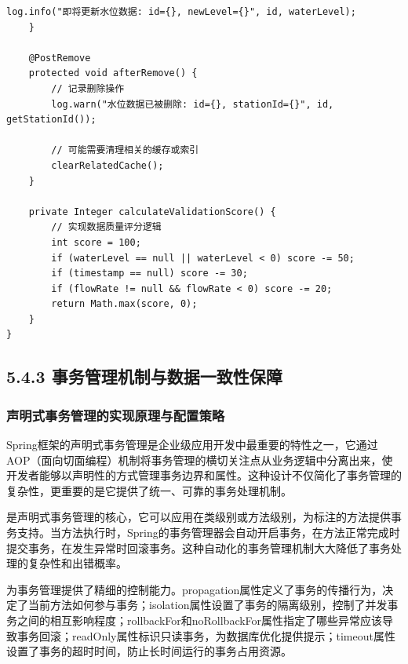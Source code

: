 \begin{lstlisting}[style=java]
        log.info("即将更新水位数据: id={}, newLevel={}", id, waterLevel);
    }
    
    @PostRemove
    protected void afterRemove() {
        // 记录删除操作
        log.warn("水位数据已被删除: id={}, stationId={}", id, getStationId());
        
        // 可能需要清理相关的缓存或索引
        clearRelatedCache();
    }
    
    private Integer calculateValidationScore() {
        // 实现数据质量评分逻辑
        int score = 100;
        if (waterLevel == null || waterLevel < 0) score -= 50;
        if (timestamp == null) score -= 30;
        if (flowRate != null && flowRate < 0) score -= 20;
        return Math.max(score, 0);
    }
}
\end{lstlisting}

\hypertarget{ux4e8bux52a1ux7ba1ux7406ux673aux5236ux4e0eux6570ux636eux4e00ux81f4ux6027ux4fddux969c}{%
\subsection{5.4.3 事务管理机制与数据一致性保障}\label{ux4e8bux52a1ux7ba1ux7406ux673aux5236ux4e0eux6570ux636eux4e00ux81f4ux6027ux4fddux969c}}

\hypertarget{ux58f0ux660eux5f0fux4e8bux52a1ux7ba1ux7406ux7684ux5b9eux73b0ux539fux7406ux4e0eux914dux7f6eux7b56ux7565}{%
\subsubsection{声明式事务管理的实现原理与配置策略}\label{ux58f0ux660eux5f0fux4e8bux52a1ux7ba1ux7406ux7684ux5b9eux73b0ux539fux7406ux4e0eux914dux7f6eux7b56ux7565}}

Spring框架的声明式事务管理是企业级应用开发中最重要的特性之一，它通过AOP（面向切面编程）机制将事务管理的横切关注点从业务逻辑中分离出来，使开发者能够以声明性的方式管理事务边界和属性。这种设计不仅简化了事务管理的复杂性，更重要的是它提供了统一、可靠的事务处理机制。

是声明式事务管理的核心，它可以应用在类级别或方法级别，为标注的方法提供事务支持。当方法执行时，Spring的事务管理器会自动开启事务，在方法正常完成时提交事务，在发生异常时回滚事务。这种自动化的事务管理机制大大降低了事务处理的复杂性和出错概率。

为事务管理提供了精细的控制能力。propagation属性定义了事务的传播行为，决定了当前方法如何参与事务；isolation属性设置了事务的隔离级别，控制了并发事务之间的相互影响程度；rollbackFor和noRollbackFor属性指定了哪些异常应该导致事务回滚；readOnly属性标识只读事务，为数据库优化提供提示；timeout属性设置了事务的超时时间，防止长时间运行的事务占用资源。

